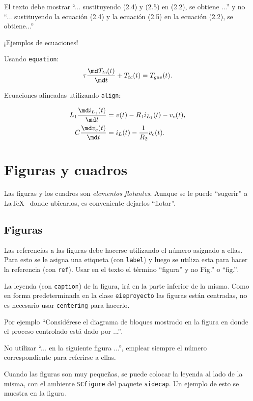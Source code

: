 El texto debe mostrar ``... sustituyendo (2.4) y (2.5) en (2.2), se obtiene ...'' y no ``... sustituyendo la ecuación (2.4) y la ecuación (2.5) en la ecuación (2.2), se obtiene...''  

¡Ejemplos de ecuaciones!

Usando \texttt{equation}:
\begin{equation}
	\tau \frac{\md T_{tc}(t)}{\md t} + T_{tc}(t) = T_{gas}(t).
\end{equation}

Ecuaciones alineadas utilizando \texttt{align}:

\begin{align}
	L_1 \frac{\md i_{L_1} (t)}{\md t} &= v(t) - R_1 i_{L_1}(t) - v_c(t), \\
	C \frac{\md v_c (t)}{\md t} &= i_L(t)- \frac{1}{R_2} v_c(t).
\end{align}

\section{Figuras y cuadros}
Las figuras y los cuadros son \emph{elementos flotantes}. Aunque se le puede ``sugerir'' a \LaTeX~ donde ubicarlos, es conveniente dejarlos ``flotar''.

\subsection{Figuras}
Las referencias a las figuras debe hacerse utilizando el número asignado a ellas.  Para esto se le asigna una etiqueta (con \texttt{label}) y luego se utiliza esta para hacer la referencia (con \texttt{ref}).  Usar en el texto el término ``figura'' y no Fig.'' o ``fig.''.

La leyenda (con \texttt{caption}) de la figura, irá en la parte inferior de la misma.  Como en forma predeterminada en la clase \texttt{eieproyecto} las figuras están centradas, no es necesario usar \texttt{centering} para hacerlo.

Por ejemplo ``Considérese el diagrama de bloques mostrado en la figura en donde el proceso controlado está dado por ...''.

No utilizar ``... en la siguiente figura ...'', emplear siempre el número correspondiente para referirse a ellas.

Cuando las figuras son muy pequeñas, se puede colocar la leyenda al lado de la misma, con el ambiente \texttt{SCfigure} del paquete \texttt{sidecap}.  Un ejemplo de esto se muestra en la figura.

